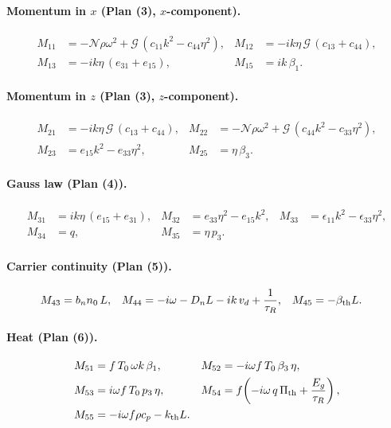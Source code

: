 \documentclass[11pt]{article}
\begin{document}
\paragraph{Momentum in $x$ (Plan (3), $x$-component).}
\begin{align}
M_{11}&=-\mathcal N\rho\omega^2+\mathcal G\,(c_{11}k^2-c_{44}\eta^2), &
M_{12}&=-ik\eta\,\mathcal G\,(c_{13}+c_{44}),\\
M_{13}&=-ik\eta\,(e_{31}+e_{15}), &
M_{15}&=ik\,\beta_1 .
\end{align}

\paragraph{Momentum in $z$ (Plan (3), $z$-component).}
\begin{align}
M_{21}&=-ik\eta\,\mathcal G\,(c_{13}+c_{44}), &
M_{22}&=-\mathcal N\rho\omega^2+\mathcal G\,(c_{44}k^2-c_{33}\eta^2),\\
M_{23}&=e_{15}k^2-e_{33}\eta^2, &
M_{25}&=\eta\,\beta_3 .
\end{align}

\paragraph{Gauss law (Plan (4)).}
\begin{align}
M_{31}&=ik\eta\,(e_{15}+e_{31}), &
M_{32}&=e_{33}\eta^2-e_{15}k^2, &
M_{33}&=\epsilon_{11}k^2-\epsilon_{33}\eta^2,\\
M_{34}&=q, &
M_{35}&=\eta\,p_3 .
\end{align}

\paragraph{Carrier continuity (Plan (5)).}
\begin{align}
M_{43}&=b_nn_0\,L, &
M_{44}&=-i\omega-D_nL-ik\,v_d+\frac1{\tau_R}, &
M_{45}&=-\beta_{\rm th}L .
\end{align}

\paragraph{Heat (Plan (6)).}
\begin{align}
M_{51}&=f\,T_0\,\omega k\,\beta_1, &
M_{52}&=-i\omega f\,T_0\,\beta_3\,\eta,\\
M_{53}&=i\omega f\,T_0\,p_3\,\eta, &
M_{54}&=f\!\left(-i\omega\,q\,\Pi_{\rm th}+\frac{E_g}{\tau_R}\right),\\
M_{55}&=-i\omega f\rho c_p-k_{\rm th}L .
\end{align}
\end{document}
